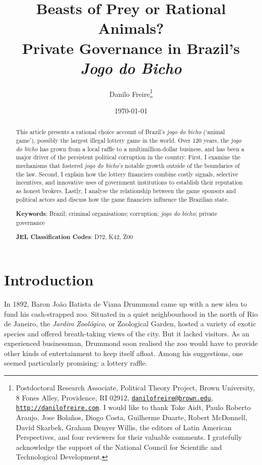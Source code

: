 \documentclass[a4paper,12pt]{article}
\title{\textbf{Beasts of Prey or Rational Animals?\\ Private Governance in Brazil's \emph{Jogo do Bicho}}}
\author{Danilo Freire\thanks{Postdoctoral Research Associate, Political Theory Project, Brown University, 8 Fones Alley, Providence, RI 02912, \href{mailto:danilofreire@brown.edu}{\texttt{danilofreire@brown.edu}}, \href{http://danilofreire.com}{\texttt{http://danilofreire.com}}. I would like to thank Toke Aidt, Paulo Roberto Araujo, Jose Bola\~{n}os, Diogo Costa, Guilherme Duarte, Robert McDonnell, David Skarbek, Graham Denyer Willis, the editors of Latin American Perspectives, and four reviewers for their valuable comments. I gratefully acknowledge the support of the National Council for Scientific and Technological Development.}
}
\date{\today}
\begin{document}
\maketitle

\begin{abstract}
 \noindent
This article presents a rational choice account of Brazil's \emph{jogo do bicho} (`animal game'), possibly the largest illegal lottery game in the world. Over 120 years, the \emph{jogo do bicho} has grown from a local raffle to a multimillion-dollar business, and has been a major driver of the persistent political corruption in the country. First, I examine the mechanisms that fostered \emph{jogo do bicho}'s notable growth outside of the boundaries of the law. Second, I explain how the lottery financiers combine costly signals, selective incentives, and innovative uses of government institutions to establish their reputation as honest brokers. Lastly, I analyse the relationship between the game sponsors and political actors and discuss how the game financiers influence the Brazilian state.       

 \vspace{.5cm}
 \noindent
 \textbf{Keywords}: Brazil; criminal organisations; corruption; \emph{jogo do bicho}; private governance
  
 \vspace{.25cm}
 \noindent
 \textbf{JEL Classification Codes}: D72, K42, Z00
\end{abstract}

\newpage

\section{Introduction}
\label{sec:intro}

In 1892, Baron João Batista de Viana Drummond came up with a new idea to fund his cash-strapped zoo. Situated in a quiet neighbourhood in the north of Rio de Janeiro, the \emph{Jardim Zoológico}, or Zoological Garden, hosted a variety of exotic species and offered breath-taking views of the city. But it lacked visitors. As an experienced businessman, Drummond soon realised the zoo would have to provide other kinds of entertainment to keep itself afloat. Among his suggestions, one seemed particularly promising: a lottery raffle.
\end{document}
